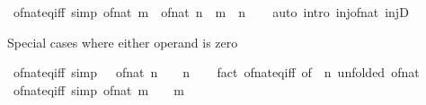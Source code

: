 \begin{isabellebody}
\isanewline
\isanewline
{}\isamarkupfalse%
\ of{\isacharunderscore}{\kern0pt}nat{\isacharunderscore}{\kern0pt}eq{\isacharunderscore}{\kern0pt}iff\ {\isacharbrackleft}{\kern0pt}simp{\isacharbrackright}{\kern0pt}{\isacharcolon}{\kern0pt}\ {\isachardoublequoteopen}of{\isacharunderscore}{\kern0pt}nat\ m\ {\isacharequal}{\kern0pt}\ of{\isacharunderscore}{\kern0pt}nat\ n\ {\isasymlongleftrightarrow}\ m\ {\isacharequal}{\kern0pt}\ n{\isachardoublequoteclose}\isanewline
%
\isadelimproof
\ \ %
\endisadelimproof
%
\isatagproof
{}\isamarkupfalse%
\ {\isacharparenleft}{\kern0pt}auto\ intro{\isacharcolon}{\kern0pt}\ inj{\isacharunderscore}{\kern0pt}of{\isacharunderscore}{\kern0pt}nat\ injD{\isacharparenright}{\kern0pt}%
\endisatagproof
{\isafoldproof}%
%
\isadelimproof
%
\endisadelimproof
%
\begin{isamarkuptext}%
Special cases where either operand is zero%
\end{isamarkuptext}\isamarkuptrue%
\isamarkupfalse%
\ of{\isacharunderscore}{\kern0pt}nat{\isacharunderscore}{\kern0pt}{}{\isacharunderscore}{\kern0pt}eq{\isacharunderscore}{\kern0pt}iff\ {\isacharbrackleft}{\kern0pt}simp{\isacharbrackright}{\kern0pt}{\isacharcolon}{\kern0pt}\ {\isachardoublequoteopen}{}\ {\isacharequal}{\kern0pt}\ of{\isacharunderscore}{\kern0pt}nat\ n\ {\isasymlongleftrightarrow}\ {}\ {\isacharequal}{\kern0pt}\ n{\isachardoublequoteclose}\isanewline
%
\isadelimproof
\ \ %
\endisadelimproof
%
\isatagproof
{}\isamarkupfalse%
\ {\isacharparenleft}{\kern0pt}fact\ of{\isacharunderscore}{\kern0pt}nat{\isacharunderscore}{\kern0pt}eq{\isacharunderscore}{\kern0pt}iff\ {\isacharbrackleft}{\kern0pt}of\ {}\ n{\isacharcomma}{\kern0pt}\ unfolded\ of{\isacharunderscore}{\kern0pt}nat{\isacharunderscore}{\kern0pt}{}{\isacharbrackright}{\kern0pt}{\isacharparenright}{\kern0pt}%
\endisatagproof
{\isafoldproof}%
%
\isadelimproof
\isanewline
%
\endisadelimproof
\isanewline
{}\isamarkupfalse%
\ of{\isacharunderscore}{\kern0pt}nat{\isacharunderscore}{\kern0pt}eq{\isacharunderscore}{\kern0pt}{}{\isacharunderscore}{\kern0pt}iff\ {\isacharbrackleft}{\kern0pt}simp{\isacharbrackright}{\kern0pt}{\isacharcolon}{\kern0pt}\ {\isachardoublequoteopen}of{\isacharunderscore}{\kern0pt}nat\ m\ {\isacharequal}{\kern0pt}\ {}\ {\isasymlongleftrightarrow}\ m\ {\isacharequal}{\kern0pt}\ {}{\isachardoublequoteclose}\isanewline
%
\isadelimproof
\ \ %
\endisadelimproof
%
\isatagproof

\end{isabellebody}
